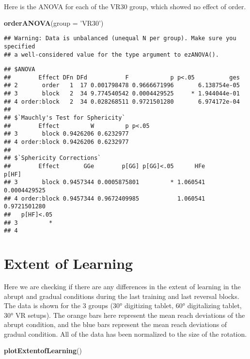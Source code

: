 \documentclass[]{article}
\newenvironment{Shaded}{\begin{snugshade}}{\end{snugshade}}
\newcommand{\KeywordTok}[1]{\textcolor[rgb]{0.13,0.29,0.53}{\textbf{#1}}}
\newcommand{\DataTypeTok}[1]{\textcolor[rgb]{0.13,0.29,0.53}{#1}}
\newcommand{\StringTok}[1]{\textcolor[rgb]{0.31,0.60,0.02}{#1}}
\newcommand{\NormalTok}[1]{#1}
\begin{document}
Here is the ANOVA for each of the VR30 group, which showed no effect of
order.

\begin{Shaded}
\begin{Highlighting}[]
\KeywordTok{orderANOVA}\NormalTok{(}\DataTypeTok{group =} \StringTok{'VR30'}\NormalTok{)}
\end{Highlighting}
\end{Shaded}

\begin{verbatim}
## Warning: Data is unbalanced (unequal N per group). Make sure you specified
## a well-considered value for the type argument to ezANOVA().
\end{verbatim}

\begin{verbatim}
## $ANOVA
##        Effect DFn DFd           F            p p<.05          ges
## 2       order   1  17 0.001798478 0.9666671996       6.138754e-05
## 3       block   2  34 9.774540542 0.0004429525     * 1.944044e-01
## 4 order:block   2  34 0.028268511 0.9721501280       6.974172e-04
## 
## $`Mauchly's Test for Sphericity`
##        Effect         W         p p<.05
## 3       block 0.9426206 0.6232977      
## 4 order:block 0.9426206 0.6232977      
## 
## $`Sphericity Corrections`
##        Effect       GGe        p[GG] p[GG]<.05      HFe        p[HF]
## 3       block 0.9457344 0.0005875801         * 1.060541 0.0004429525
## 4 order:block 0.9457344 0.9672409985           1.060541 0.9721501280
##   p[HF]<.05
## 3         *
## 4
\end{verbatim}

\section{Extent of Learning}\label{extent-of-learning}

Here we are checking if there are any differences in the extent of
learning in the abrupt and gradual conditions during the last training
and last reversal blocks. The data is shown for the 3 groups (30°
digitizing tablet, 60° digitalizing tablet, 30° VR setups). The orange
bars here represent the mean reach deviations of the abrupt condition,
and the blue bars represent the mean reach deviations of gradual
condition. All of the data has been normalized to the size of the
rotation.

\begin{Shaded}
\begin{Highlighting}[]
\KeywordTok{plotExtentofLearning}\NormalTok{()}
\end{Highlighting}
\end{Shaded}
\end{document}
